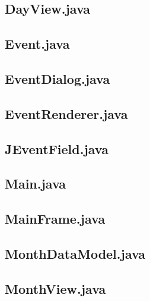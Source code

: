 \documentclass{article}
\begin{document}


\subsection{DayView.java}



\subsection{Event.java}



\subsection{EventDialog.java}



\subsection{EventRenderer.java}



\subsection{JEventField.java}



\subsection{Main.java}



\subsection{MainFrame.java}



\subsection{MonthDataModel.java}



\subsection{MonthView.java}
\end{document}
